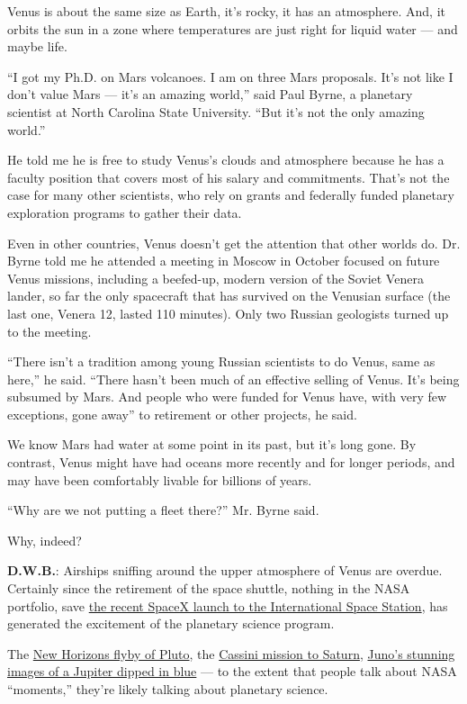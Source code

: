 Venus is about the same size as Earth, it's rocky, it has an atmosphere.
And, it orbits the sun in a zone where temperatures are just right for
liquid water --- and maybe life.

``I got my Ph.D. on Mars volcanoes. I am on three Mars proposals. It's
not like I don't value Mars --- it's an amazing world,'' said Paul
Byrne, a planetary scientist at North Carolina State University. ``But
it's not the only amazing world.''

He told me he is free to study Venus's clouds and atmosphere because he
has a faculty position that covers most of his salary and commitments.
That's not the case for many other scientists, who rely on grants and
federally funded planetary exploration programs to gather their data.

Even in other countries, Venus doesn't get the attention that other
worlds do. Dr. Byrne told me he attended a meeting in Moscow in October
focused on future Venus missions, including a beefed-up, modern version
of the Soviet Venera lander, so far the only spacecraft that has
survived on the Venusian surface (the last one, Venera 12, lasted 110
minutes). Only two Russian geologists turned up to the meeting.

``There isn't a tradition among young Russian scientists to do Venus,
same as here,'' he said. ``There hasn't been much of an effective
selling of Venus. It's being subsumed by Mars. And people who were
funded for Venus have, with very few exceptions, gone away'' to
retirement or other projects, he said.

We know Mars had water at some point in its past, but it's long gone. By
contrast, Venus might have had oceans more recently and for longer
periods, and may have been comfortably livable for billions of years.

``Why are we not putting a fleet there?'' Mr. Byrne said.

Why, indeed?

\textbf{D.W.B.}: Airships sniffing around the upper atmosphere of Venus
are overdue. Certainly since the retirement of the space shuttle,
nothing in the NASA portfolio, save
\href{https://www.nytimes3xbfgragh.onion/2020/05/30/science/spacex-nasa-astronauts.html}{the
recent SpaceX launch to the International Space Station}, has generated
the excitement of the planetary science program.

The
\href{https://www.nytimes3xbfgragh.onion/interactive/2016/03/17/science/pluto-images-charon-moons-new-horizons-flyby.html}{New
Horizons flyby of Pluto}, the
\href{https://www.nytimes3xbfgragh.onion/interactive/2017/09/14/science/cassini-saturn-images.html}{Cassini
mission to Saturn},
\href{https://www.nytimes3xbfgragh.onion/2017/04/07/science/jupiter-photos-hubble-telescope-juno-nasa.html}{Juno's
stunning images of a Jupiter dipped in blue} --- to the extent that
people talk about NASA ``moments,'' they're likely talking about
planetary science.

